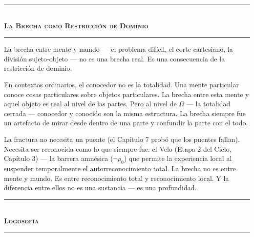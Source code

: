 \documentclass[10pt, openany, oneside]{book}
\renewcommand{\normalsize}{\fontsize{10}{13}\selectfont}
\begin{document}
\vspace{1.5em}


\begin{center}
    \rule{0.3\textwidth}{0.4pt}\\[0.5em]
    {\normalsize\bfseries\scshape La Brecha como Restricción de Dominio}\\[0.3em]
    \rule{0.3\textwidth}{0.4pt}
\end{center}

\vspace{1em}

\noindent La brecha entre mente y mundo --- el problema difícil, el corte cartesiano, la división sujeto-objeto --- no es una brecha real. Es una consecuencia de la restricción de dominio.

En contextos ordinarios, el conocedor no es la totalidad. Una mente particular conoce cosas particulares sobre objetos particulares. La brecha entre esta mente y aquel objeto es real al nivel de las partes. Pero al nivel de $\Omega$ --- la totalidad cerrada --- conocedor y conocido son la misma estructura. La brecha siempre fue un artefacto de mirar desde dentro de una parte y confundir la parte con el todo.

La fractura no necesita un puente (el Capítulo 7 probó que los puentes fallan). Necesita ser reconocida como lo que siempre fue: el Velo (Etapa 2 del Ciclo, Capítulo 3) --- la barrera amnésica ($\neg\rho_0$) que permite la experiencia local al suspender temporalmente el autorreconocimiento total. La brecha no es entre mente y mundo. Es entre reconocimiento total y reconocimiento local. Y la diferencia entre ellos no es una sustancia --- es una profundidad.

\vspace{1.5em}


\begin{center}
    \rule{0.3\textwidth}{0.4pt}\\[0.5em]
    {\normalsize\bfseries\scshape Logosofía}\\[0.3em]
    \rule{0.3\textwidth}{0.4pt}
\end{center}
\end{document}
